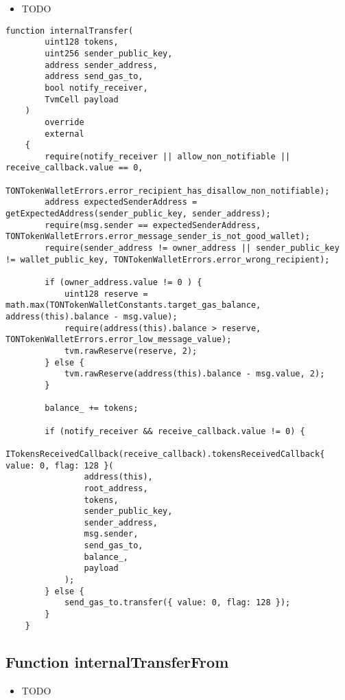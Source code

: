 \noindent\begin{itemize}
\item TODO
\end{itemize}

\begin{lstlisting}[firstnumber=370]
    function internalTransfer(
        uint128 tokens,
        uint256 sender_public_key,
        address sender_address,
        address send_gas_to,
        bool notify_receiver,
        TvmCell payload
    )
        override
        external
    {
        require(notify_receiver || allow_non_notifiable || receive_callback.value == 0,
                TONTokenWalletErrors.error_recipient_has_disallow_non_notifiable);
        address expectedSenderAddress = getExpectedAddress(sender_public_key, sender_address);
        require(msg.sender == expectedSenderAddress, TONTokenWalletErrors.error_message_sender_is_not_good_wallet);
        require(sender_address != owner_address || sender_public_key != wallet_public_key, TONTokenWalletErrors.error_wrong_recipient);

        if (owner_address.value != 0 ) {
            uint128 reserve = math.max(TONTokenWalletConstants.target_gas_balance, address(this).balance - msg.value);
            require(address(this).balance > reserve, TONTokenWalletErrors.error_low_message_value);
            tvm.rawReserve(reserve, 2);
        } else {
            tvm.rawReserve(address(this).balance - msg.value, 2);
        }

        balance_ += tokens;

        if (notify_receiver && receive_callback.value != 0) {
            ITokensReceivedCallback(receive_callback).tokensReceivedCallback{ value: 0, flag: 128 }(
                address(this),
                root_address,
                tokens,
                sender_public_key,
                sender_address,
                msg.sender,
                send_gas_to,
                balance_,
                payload
            );
        } else {
            send_gas_to.transfer({ value: 0, flag: 128 });
        }
    }
\end{lstlisting}

\subsection{Function internalTransferFrom}

\noindent\begin{itemize}
\item TODO
\end{itemize}

